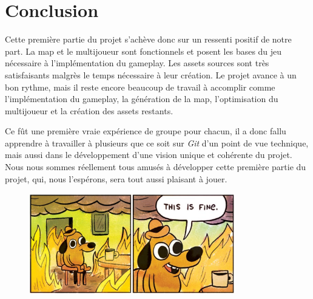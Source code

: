 \documentclass[12pt]{report}
\begin{document}
\chapter{Conclusion}

Cette première partie du projet s'achève donc sur un ressenti positif de notre part. La map et le multijoueur sont fonctionnels et posent les bases du jeu nécessaire à l'implémentation du gameplay. Les assets sources sont très satisfaisants malgrès le temps nécessaire à leur création. Le projet avance à un bon rythme, mais il reste encore beaucoup de travail à accomplir comme l'implémentation du gameplay, la génération de la map, l'optimisation du multijoueur et la création des assets restants.

Ce fût une première vraie expérience de groupe pour chacun, il a donc fallu apprendre à travailler à plusieurs que ce soit sur \textit{Git} d'un point de vue technique, mais aussi dans le développement d'une vision unique et cohérente du projet. Nous nous sommes réellement tous amusés à développer cette première partie du projet, qui, nous l'espérons, sera tout aussi plaisant à jouer.

\vfill

\begin{figure}[H]
    \centering
    \includegraphics[width=0.8\textwidth]{project_real_mood}
\end{figure}
\end{document}
